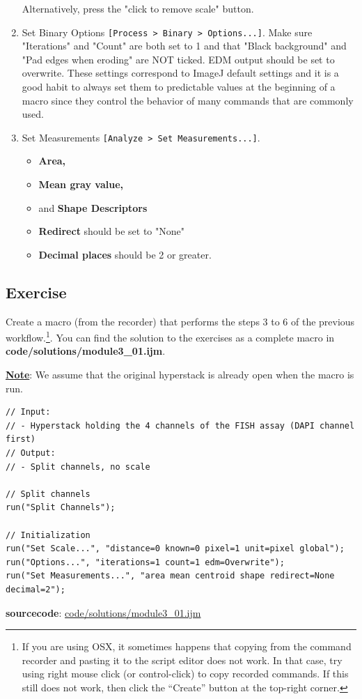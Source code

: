 \documentclass[11pt,a4paper,oneside]{report}
\newcommand{\ijmenu}[1]{\texttt{\small#1}}
\begin{document}
\begin{enumerate}
\begin{itemize}
    \end{itemize}

    Alternatively, press the "click to remove scale" button. 
    
    \item Set Binary Options 
    \ijmenu{[Process > Binary > Options...]}.
    Make sure "Iterations" and "Count" are both set to 1 and that "Black background" and "Pad edges when eroding" are NOT ticked. EDM output should be set to overwrite. These settings correspond to ImageJ default settings and it is a good habit to always set them to predictable values at the beginning of a macro since they control the behavior of many commands that are commonly used. 
    
    \item Set Measurements 
    \ijmenu{[Analyze > Set Measurements...]}.
    \begin{itemize}  
        \item\textbf{Area,} 
        \item\textbf{Mean gray value,}
        \item and \textbf{Shape Descriptors} 
        
        \item\textbf{Redirect} should be set to "None" 
        \item\textbf{Decimal places} should be 2 or greater.  
    \end{itemize} 

\end{enumerate}
\subsection{Exercise }
Create a macro (from the recorder) that performs the steps 3 to 6 of the previous workflow.\footnote{If you are using OSX, it sometimes happens that copying from the command recorder and pasting it to the script editor does not work. In that case, try using right mouse click (or control-click) to copy recorded commands. If this still does not work, then click the ``Create'' button at the top-right corner.}. You can find the solution to the exercises as a complete macro in \textbf{code/solutions/module3\_01.ijm}.

\underline{\textbf{Note}}: We assume that the original hyperstack is already open when the macro is run.


\begin{lstlisting}[linerange={1-4}]
// Input: 
// - Hyperstack holding the 4 channels of the FISH assay (DAPI channel first)
// Output: 
// - Split channels, no scale

// Split channels
run("Split Channels");

// Initialization
run("Set Scale...", "distance=0 known=0 pixel=1 unit=pixel global");
run("Options...", "iterations=1 count=1 edm=Overwrite");
run("Set Measurements...", "area mean centroid shape redirect=None decimal=2");
\end{lstlisting}
\textbf{sourcecode}: \href{http://www.example.com/contents}{code/solutions/module3\_01.ijm}
\end{document}
